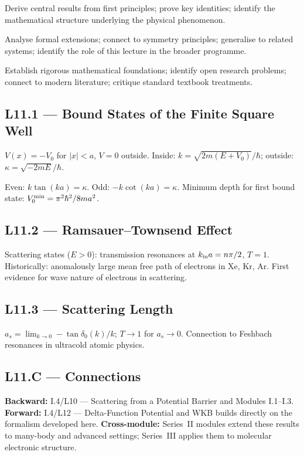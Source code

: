 \quad
Derive central results from first principles; prove key identities; identify
the mathematical structure underlying the physical phenomenon.

\quad
Analyse formal extensions; connect to symmetry principles; generalise to
related systems; identify the role of this lecture in the broader programme.

\quad
Establish rigorous mathematical foundations; identify open research problems;
connect to modern literature; critique standard textbook treatments.


\subsection*{L11.1 — Bound States of the Finite Square Well}
$V(x) = -V_0$ for $|x|<a$, $V=0$ outside.
Inside: $k=\sqrt{2m(E+V_0)}/\hbar$; outside: $\kappa=\sqrt{-2mE}/\hbar$.

\begin{tcolorbox}[lecturebox, title={Transcendental Equations}]
Even: $k\tan(ka) = \kappa$. Odd: $-k\cot(ka) = \kappa$.
Minimum depth for first bound state: $V_0^{\rm min} = \pi^2\hbar^2/8ma^2$.
\end{tcolorbox}

\subsection*{L11.2 — Ramsauer–Townsend Effect}
Scattering states ($E>0$): transmission resonances at $k_{\rm in}a = n\pi/2$, $T=1$.
Historically: anomalously large mean free path of electrons in Xe, Kr, Ar.
First evidence for wave nature of electrons in scattering.

\subsection*{L11.3 — Scattering Length}
$a_s = \lim_{k\to0}-\tan\delta_0(k)/k$; $T\to1$ for $a_s\to0$.
Connection to Feshbach resonances in ultracold atomic physics.


\subsection*{L11.C — Connections}
\label{sec:L11.C}
\textbf{Backward:} I.4/L10 — Scattering from a Potential Barrier and Modules I.1–I.3.
\textbf{Forward:} I.4/L12 — Delta-Function Potential and WKB builds directly on the formalism developed here.
\textbf{Cross-module:} Series~II modules extend these results to many-body and
advanced settings; Series~III applies them to molecular electronic structure.

